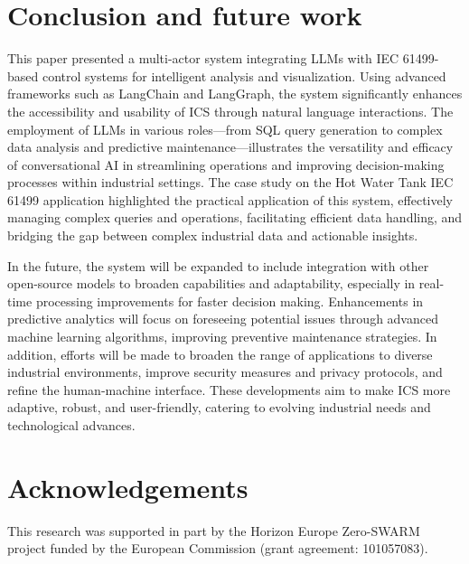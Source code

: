 \begin{bibunit}
\section{Conclusion and future work}
\label{sec:conclusion}

This paper presented a multi-actor system integrating LLMs with IEC 61499-based control systems for intelligent analysis and visualization. Using advanced frameworks such as LangChain and LangGraph, the system significantly enhances the accessibility and usability of ICS through natural language interactions. The employment of LLMs in various roles—from SQL query generation to complex data analysis and predictive maintenance—illustrates the versatility and efficacy of conversational AI in streamlining operations and improving decision-making processes within industrial settings. The case study on the Hot Water Tank IEC 61499 application highlighted the practical application of this system, effectively managing complex queries and operations, facilitating efficient data handling, and bridging the gap between complex industrial data and actionable insights.

In the future, the system will be expanded to include integration with other open-source models to broaden capabilities and adaptability, especially in real-time processing improvements for faster decision making. Enhancements in predictive analytics will focus on foreseeing potential issues through advanced machine learning algorithms, improving preventive maintenance strategies. In addition, efforts will be made to broaden the range of applications to diverse industrial environments, improve security measures and privacy protocols, and refine the human-machine interface. These developments aim to make ICS more adaptive, robust, and user-friendly, catering to evolving industrial needs and technological advances.


\section{Acknowledgements}
This research was supported in part by the Horizon Europe Zero-SWARM project funded by the European Commission (grant agreement: 101057083).

\putbib
\end{bibunit} 